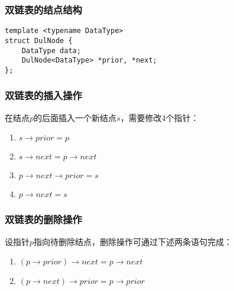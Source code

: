 \documentclass[12pt,a4paper]{amsart}
\begin{document}
\subsubsection{双链表的结点结构}

\begin{center}
\end{center}

\begin{lstlisting}[caption=双链表结点定义]
template <typename DataType>
struct DulNode {
    DataType data;
    DulNode<DataType> *prior, *next;
};
\end{lstlisting}

\subsubsection{双链表的插入操作}

在结点$p$的后面插入一个新结点$s$，需要修改4个指针：

\begin{enumerate}
\item $s \rightarrow prior = p$
\item $s \rightarrow next = p \rightarrow next$
\item $p \rightarrow next \rightarrow prior = s$
\item $p \rightarrow next = s$
\end{enumerate}

\subsubsection{双链表的删除操作}

设指针$p$指向待删除结点，删除操作可通过下述两条语句完成：
\begin{enumerate}
\item $(p \rightarrow prior) \rightarrow next = p \rightarrow next$
\item $(p \rightarrow next) \rightarrow prior = p \rightarrow prior$
\end{enumerate}
\end{document}
